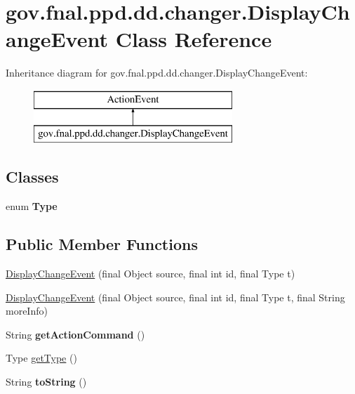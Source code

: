 \hypertarget{classgov_1_1fnal_1_1ppd_1_1dd_1_1changer_1_1DisplayChangeEvent}{\section{gov.\-fnal.\-ppd.\-dd.\-changer.\-Display\-Change\-Event Class Reference}
\label{classgov_1_1fnal_1_1ppd_1_1dd_1_1changer_1_1DisplayChangeEvent}
}
Inheritance diagram for gov.\-fnal.\-ppd.\-dd.\-changer.\-Display\-Change\-Event\-:\begin{figure}[H]
\begin{center}
\leavevmode
\includegraphics[height=2.000000cm]{classgov_1_1fnal_1_1ppd_1_1dd_1_1changer_1_1DisplayChangeEvent}
\end{center}
\end{figure}
\subsection*{Classes}
\begin{DoxyCompactItemize}
\item 
enum {\bfseries Type}
\end{DoxyCompactItemize}
\subsection*{Public Member Functions}
\begin{DoxyCompactItemize}
\item 
\hyperlink{classgov_1_1fnal_1_1ppd_1_1dd_1_1changer_1_1DisplayChangeEvent_ac8c557db1793f12f83ab1a988b3c3247}{Display\-Change\-Event} (final Object source, final int id, final Type t)
\item 
\hyperlink{classgov_1_1fnal_1_1ppd_1_1dd_1_1changer_1_1DisplayChangeEvent_ace5166744285114a2ea820006afcf9d2}{Display\-Change\-Event} (final Object source, final int id, final Type t, final String more\-Info)
\item 
\hypertarget{classgov_1_1fnal_1_1ppd_1_1dd_1_1changer_1_1DisplayChangeEvent_aa9d6c32dc6c463df4bfff0456cbb5ee3}{String {\bfseries get\-Action\-Command} ()}\label{classgov_1_1fnal_1_1ppd_1_1dd_1_1changer_1_1DisplayChangeEvent_aa9d6c32dc6c463df4bfff0456cbb5ee3}

\item 
Type \hyperlink{classgov_1_1fnal_1_1ppd_1_1dd_1_1changer_1_1DisplayChangeEvent_a6893ab71256285a1b8ab889c489f7685}{get\-Type} ()
\item 
\hypertarget{classgov_1_1fnal_1_1ppd_1_1dd_1_1changer_1_1DisplayChangeEvent_ae368d2c34216aa7b39d4c359912a5bcf}{String {\bfseries to\-String} ()}\label{classgov_1_1fnal_1_1ppd_1_1dd_1_1changer_1_1DisplayChangeEvent_ae368d2c34216aa7b39d4c359912a5bcf}

\end{DoxyCompactItemize}


